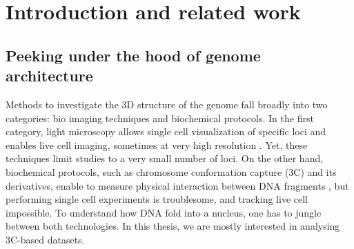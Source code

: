

\chapter{Introduction and related work}

\graphicspath{{1_introduction/}}

\begin{abstract}{Résumé}

L'architecture spatiale et temporelle du génôme joue un rôle important dans
beaucoup de fonctions génomiques, mais est cependant à l'heure actuelle peu
compris. Le développement récent du protocol Hi-C, qui permet en une seule
expérience de mesurer les fréquences d'interactions entre pair de loci sur
tout le génome, ouvre la porte à une étude plus systématique de la structure
tri-dimensionnelle du génome. Dans ce chapitre, nous introduisons les concepts
sous-jacents à la capture de la conformation des chromosomes, la structure de
l'ADN et aux méthodes d'inférence de l'architecture 3D du génome.

\end{abstract}

\begin{abstract}{Abstract}

The spatial and temporal genome architecture is thought to play an important
role in many genomic functions, but is yet poorly understood. Recently, the
development of the Hi-C protocol, which allows in a single experiments to
assess genome wide physical interactions between pairs of loci, has paved the
way for a systematic analysis of the 3D structure of DNA. We aim in this
chapter at providing some background on chromosome conformation capture, the
structure of DNA and the field of 3D architecture inference.

\end{abstract}


\section{Peeking under the hood of genome architecture}

Methods to investigate the 3D structure of the genome fall broadly into two
categories: bio imaging techniques and biochemical protocols. In the first
category, light microscopy allows single cell visualization of specific loci
and enables live cell imaging, sometimes at very high resolution
\citep{cremer:chromosome-2010}. Yet, these techniques limit studies to a very
small number of loci. On the other hand, biochemical protocols, such as
chromosome conformation capture (3C) and its derivatives, enable to measure
physical interaction between DNA fragments \citep{dekker:capturing}, but
performing single cell experiments is troublesome, and tracking live cell
impossible. To understand how DNA fold into a nucleus, one has to jungle
between both technologies. In this thesis, we are mostly interested in
analysing 3C-based datasets.

